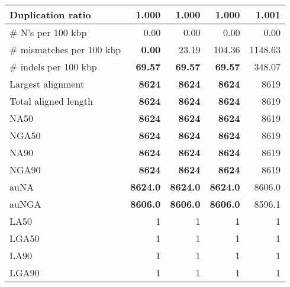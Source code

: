\documentclass[12pt,a4paper]{article}
\begin{document}
\begin{table}[ht]
\begin{center}
\begin{tabular}{|l*{4}{|r}|}
Duplication ratio & {\bf 1.000} & {\bf 1.000} & {\bf 1.000} & 1.001 \\ \hline
\# N's per 100 kbp & 0.00 & 0.00 & 0.00 & 0.00 \\ \hline
\# mismatches per 100 kbp & {\bf 0.00} & 23.19 & 104.36 & 1148.63 \\ \hline
\# indels per 100 kbp & {\bf 69.57} & {\bf 69.57} & {\bf 69.57} & 348.07 \\ \hline
Largest alignment & {\bf 8624} & {\bf 8624} & {\bf 8624} & 8619 \\ \hline
Total aligned length & {\bf 8624} & {\bf 8624} & {\bf 8624} & 8619 \\ \hline
NA50 & {\bf 8624} & {\bf 8624} & {\bf 8624} & 8619 \\ \hline
NGA50 & {\bf 8624} & {\bf 8624} & {\bf 8624} & 8619 \\ \hline
NA90 & {\bf 8624} & {\bf 8624} & {\bf 8624} & 8619 \\ \hline
NGA90 & {\bf 8624} & {\bf 8624} & {\bf 8624} & 8619 \\ \hline
auNA & {\bf 8624.0} & {\bf 8624.0} & {\bf 8624.0} & 8606.0 \\ \hline
auNGA & {\bf 8606.0} & {\bf 8606.0} & {\bf 8606.0} & 8596.1 \\ \hline
LA50 & 1 & 1 & 1 & 1 \\ \hline
LGA50 & 1 & 1 & 1 & 1 \\ \hline
LA90 & 1 & 1 & 1 & 1 \\ \hline
LGA90 & 1 & 1 & 1 & 1 \\ \hline
\end{tabular}
\end{center}
\end{table}
\end{document}
